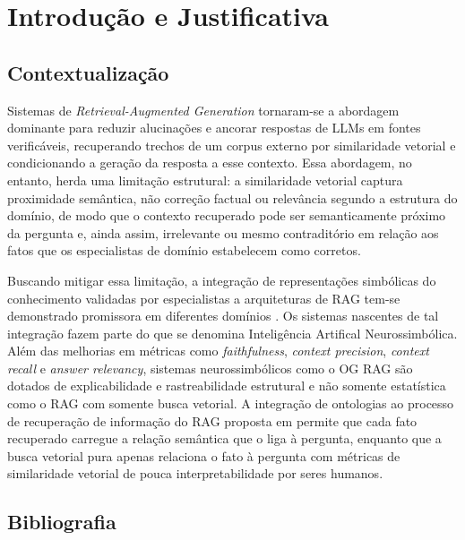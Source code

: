 \documentclass{article}
\begin{document}
\newpage

\section{Introdução e Justificativa}

\subsection{Contextualização}

Sistemas de \textit{Retrieval-Augmented Generation} \cite{lewis2020retrieval} tornaram-se a abordagem dominante para reduzir alucinações e ancorar respostas de LLMs em fontes verificáveis, recuperando trechos de um corpus externo por similaridade vetorial e condicionando a geração da resposta a esse contexto. Essa abordagem, no entanto, herda uma limitação estrutural: a similaridade vetorial captura proximidade semântica, não correção factual ou relevância segundo a estrutura do domínio, de modo que o contexto recuperado pode ser semanticamente próximo da pergunta e, ainda assim, irrelevante ou mesmo contraditório em relação aos fatos que os especialistas de domínio estabelecem como corretos. 

Buscando mitigar essa limitação, a integração de representações simbólicas do conhecimento validadas por especialistas a arquiteturas de RAG tem-se demonstrado promissora em diferentes domínios \cite{sharma2025ograg} \cite{feng2025ontologyrag}. Os sistemas nascentes de tal integração fazem parte do que se denomina Inteligência Artifical Neurossimbólica. Além das melhorias em métricas como \textit{faithfulness}, \textit{context precision}, \textit{context recall} e \textit{answer relevancy}, sistemas neurossimbólicos como o OG RAG \cite{sharma2025ograg} são dotados de explicabilidade e rastreabilidade estrutural e não somente estatística como o RAG com somente busca vetorial. A integração de ontologias ao processo de recuperação de informação do RAG proposta em \cite{sharma2025ograg} permite que cada fato recuperado carregue a relação semântica que o liga à pergunta, enquanto que a busca vetorial pura apenas relaciona o fato à pergunta com métricas de similaridade vetorial de pouca interpretabilidade por seres humanos.

\subsection{Bibliografia}
\end{document}
